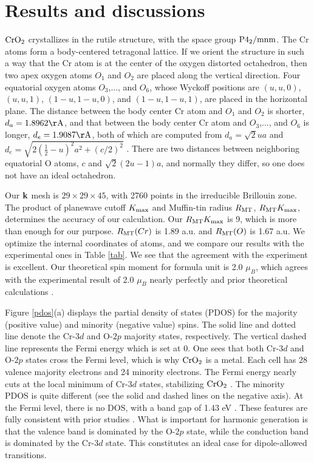 \documentclass[checkin,showpacs,psfig,aps,pra]{revtex4}
\newcommand{\Cr}{$\rm CrO_{2}$ }
\begin{document}
 


\section{Results and discussions}



 \Cr crystallizes in the rutile structure, with the space group $\rm
 P4_2/mnm$.  The Cr atoms form a body-centered tetragonal lattice.  If
 we orient the structure in such a way that the Cr atom is at the
 center of the oxygen distorted octahedron, then two apex oxygen atoms
 $O_1$ and $O_2$ are placed along the vertical direction. Four
 equatorial oxygen atoms $O_3$,..., and $O_6$, whose Wyckoff positions
 are $(u,u,0)$, $(u,u,1)$, $(1-u,1-u,0)$, and $(1-u,1-u,1)$, are
 placed in the horizontal plane. The distance between the body center
 Cr atom and $O_1$ and $O_2$ is shorter, $d_a=1.8962 \rm \AA$, and
 that between the body center Cr atom and $O_3$,..., and $O_6$ is
 longer, $d_e=1.9087 \rm \AA$, both of which are computed from
 $d_a=\sqrt{2}ua$ and $d_e=\sqrt{2(\frac{1}{2}-u)^2a^2+(c/2)^2}$
 \cite{sorantin1992}. There are two distances between neighboring
 equatorial O atoms, $c$ and $\sqrt{2}(2u-1)a$, and normally they
 differ, so one does not have an ideal octahedron.



 Our ${\bf k}$ mesh is $29\times 29 \times 45$, with 2760 points in the
 irreducible Brillouin zone.  {The product of planewave cutoff $K_{\rm
     max}$ and Muffin-tin radius $R_{\rm MT}$, $R_{\rm MT}K_{\rm
     max}$, determines the accuracy of our calculation.  Our $R_{\rm
     MT}K_{\rm max}$ is 9, which is more than enough for our
   purpose. $R_{\rm MT}(Cr)$ is 1.89 a.u. and $R_{\rm MT}(O)$ is 1.67
   a.u.  We optimize the internal coordinates of atoms, and we compare
   our results with the experimental ones in Table \ref{tab}.} We see
 that the agreement with the experiment is excellent.  Our theoretical
 spin moment for formula unit is 2.0 $\mu_B$, which agrees with the
 experimental result of 2.0 $\mu_B$ nearly perfectly and prior
 theoretical calculations \cite{schwarz1986,sorantin1992}.

Figure \ref{pdos}(a) displays the partial density of states (PDOS) for
the majority (positive value) and minority (negative value) spins.
The solid line and dotted line denote the Cr-$3d$ and O-$2p$ majority
states, respectively. The vertical dashed line represents the Fermi
energy which is set at 0. One sees that both Cr-$3d$ and O-$2p$ states
cross the Fermi level, which is why \Cr is a metal. Each cell has 28
valence majority electrons and 24 minority electrons.  The Fermi
energy nearly cuts at the local minimum of Cr-$3d$ states, stabilizing
\Cr \cite{sorantin1992}.  The minority PDOS is quite different (see
the solid and dashed lines on the negative axis). At the Fermi level,
there is no DOS, with a band gap of 1.43 eV \cite{schwarz1986}. These
features are fully consistent with prior studies
\cite{schwarz1986,sorantin1992,mazin1999}.  What is important for
harmonic generation is that the valence band is dominated by the
O-$2p$ state, while the conduction band is dominated by the Cr-$3d$
state. This constitutes an ideal case for dipole-allowed transitions.
\end{document}
